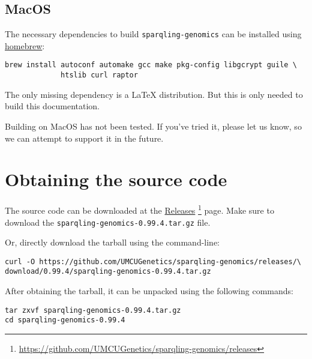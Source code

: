 \subsection{MacOS}

  The necessary dependencies to build \texttt{sparqling-genomics} can be
  installed using \href{https://brew.sh/}{homebrew}:

\begin{siderules}
\begin{verbatim}
brew install autoconf automake gcc make pkg-config libgcrypt guile \
             htslib curl raptor
\end{verbatim}
\end{siderules}

  The only missing dependency is a \LaTeX{} distribution.  But this is
  only needed to build this documentation.

  Building on MacOS has not been tested.  If you've tried it, please let
  us know, so we can attempt to support it in the future.

\section{Obtaining the source code}
\label{sec:obtaining-tarball}

  \begin{sloppypar}
  The source code can be downloaded at the
  \href{https://github.com/UMCUGenetics/sparqling-genomics/releases}%
  {Releases}%
  \footnote{\url{https://github.com/UMCUGenetics/sparqling-genomics/releases}}
  page.  Make sure to download the \mbox{\texttt{sparqling-genomics-0.99.4.tar.gz}}
  file.
  \end{sloppypar}

  Or, directly download the tarball using the command-line:
\begin{siderules}
\begin{verbatim}
curl -O https://github.com/UMCUGenetics/sparqling-genomics/releases/\
download/0.99.4/sparqling-genomics-0.99.4.tar.gz
\end{verbatim}
\end{siderules}

  After obtaining the tarball, it can be unpacked using the following commands:

\begin{siderules}
\begin{verbatim}
tar zxvf sparqling-genomics-0.99.4.tar.gz
cd sparqling-genomics-0.99.4
\end{verbatim}
\end{siderules}

